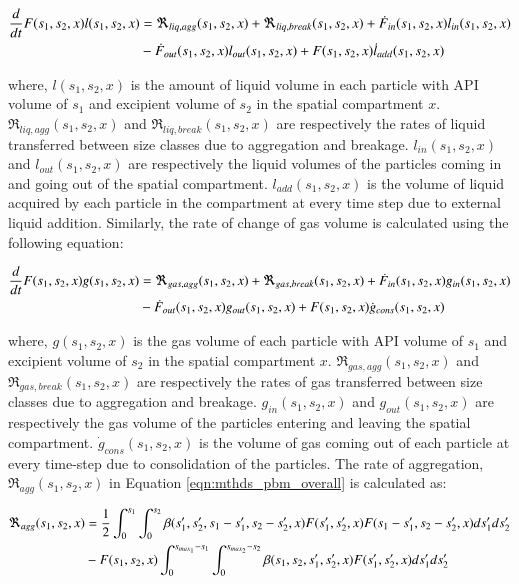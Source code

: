 \documentclass[preprint,11pt,authoryear]{elsarticle}
\begin{document}
\begin{align}
\frac{d}{dt}F(s_1,s_2,x)l(s_1,s_2,x)&= 
\Re_{liq,agg}(s_1,s_2,x)+\Re_{liq,break}(s_1,s_2,x)+\dot{F}_{in}(s_1,s_2,x)l_{in}(s_1,s_2,x)\notag\\
&-\dot{F}_{out}(s_1,s_2,x)l_{out}(s_1,s_2,x)+F(s_1,s_2,x)\dot{l}_{add}(s_1,s_2,x)
\label{eqn:mthds_pbm_rate} 
\end{align}

where, $l(s_1,s_2,x)$ is the amount of liquid volume in each particle with API volume of $s_1$ and
excipient volume of $s_2$ in the spatial compartment $x$. $\Re_{liq,agg}(s_1,s_2,x)$ and
$\Re_{liq,break}(s_1,s_2,x)$ are respectively the rates of liquid transferred between size classes due to
aggregation and breakage. $l_{in}(s_1,s_2,x)$ and $l_{out}(s_1,s_2,x)$ are respectively the liquid
volumes of the particles coming in and going out of the spatial compartment. $l_{add}(s_1,s_2,x)$ is
the volume of liquid acquired by each particle in the compartment at every time step due to external
liquid addition.
Similarly, the rate of change of gas volume is calculated using the following equation:

\begin{align}
\frac{d}{dt}F(s_1,s_2,x)g(s_1,s_2,x)&= 
\Re_{gas,agg}(s_1,s_2,x)+\Re_{gas,break}(s_1,s_2,x)+\dot{F}_{in}(s_1,s_2,x)g_{in}(s_1,s_2,x)\notag\\
&-\dot{F}_{out}(s_1,s_2,x)g_{out}(s_1,s_2,x)+F(s_1,s_2,x)\dot{g}_{cons}(s_1,s_2,x)
\label{eqn:mthds_pbm_gas_agg} 
\end{align}

where, $g(s_1,s_2,x)$ is the gas volume of each particle with API volume of $s_1$ and excipient
volume of $s_2$ in the spatial compartment $x$. $\Re_{gas,agg}(s_1,s_2,x)$ and
$\Re_{gas,break}(s_1,s_2,x)$ are respectively the rates of gas transferred between size classes due to
aggregation and breakage. $g_{in}(s_1,s_2,x)$ and $g_{out}(s_1,s_2,x)$ are respectively the gas
volume of the particles entering and leaving the spatial compartment. $\dot{g}_{cons}(s_1,s_2,x)$ is the
volume of gas coming out of each particle at every time-step due to consolidation of the particles.
The rate of aggregation, $\Re_{agg}(s_1,s_2,x)$ in Equation \ref{eqn:mthds_pbm_overall} is
calculated as: \citep{Chaturbedi2017}

\begin{align}
\Re_{agg}(s_1,s_2,x)&= \frac{1}{2}\int _0^{s_1} \int_0^{s_2} 
\beta(s_1',s_2',s_1-s_1',s_2-s_2',x)F(s_1',s_2',x)F(s_1-s_1',s_2-s_2',x)ds_1'ds_2'\notag\\ 
&- F(s_1,s_2,x)\int _0^{s_{max_1}-s_1} \int_0^{s_{max_2}-s_2} 
\beta(s_1,s_2,s_1',s_2',x)F(s_1',s_2',x)ds_1'ds_2'
\label{eqn:mthds_r_agg}
\end{align}
\end{document}
